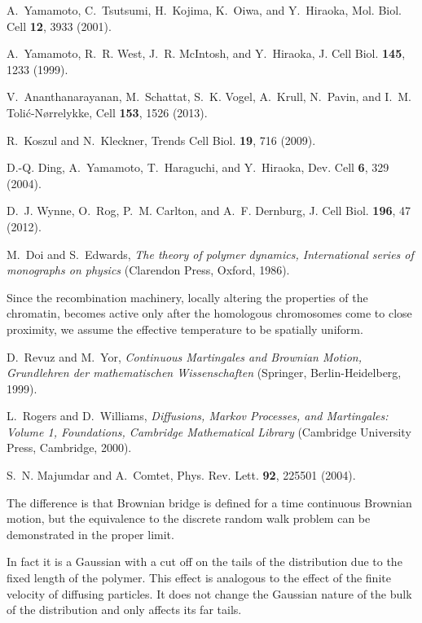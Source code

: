 \documentclass[aps,showpacs,twocolumn,floatfix,prx,superscriptaddress]{revtex4-1}
\begin{document}
\begin{thebibliography}{10}
A.~Yamamoto,
  C.~Tsutsumi,
  H.~Kojima,
  K.~Oiwa, and
  Y.~Hiraoka,
  Mol. Biol. Cell \textbf{12},
  3933 (2001).

A.~Yamamoto,
  R.~R. West,
  J.~R. McIntosh,
  and Y.~Hiraoka,
  J. Cell Biol.
  \textbf{145}, 1233 (1999).

V.~Ananthanarayanan,
  M.~Schattat,
  S.~K. Vogel,
  A.~Krull,
  N.~Pavin, and
  I.~M. Toli\'c-N\o rrelykke,
  Cell \textbf{153}, 1526
  (2013).

R.~Koszul and
  N.~Kleckner,
  Trends Cell Biol. \textbf{19},
  716 (2009).

D.-Q. Ding,
  A.~Yamamoto,
  T.~Haraguchi,
  and Y.~Hiraoka,
  Dev. Cell \textbf{6},
  329 (2004).

D.~J. Wynne,
  O.~Rog,
  P.~M. Carlton,
  and A.~F.
  Dernburg, J. Cell Biol.
  \textbf{196}, 47 (2012).

M.~Doi and
  S.~Edwards,
  \emph{The theory of polymer dynamics, International series
  of monographs on physics} (Clarendon Press, Oxford,
  1986).
  
{\color{blue} Since the recombination machinery, locally altering the properties of the chromatin, becomes active only after the homologous chromosomes come to close proximity, we assume the effective temperature to be spatially uniform.}

D.~Revuz and
  M.~Yor,
  \emph{Continuous Martingales and Brownian Motion,
  Grundlehren der mathematischen Wissenschaften} (Springer, Berlin-Heidelberg, 1999).

L.~Rogers and
  D.~Williams,
  \emph{Diffusions, Markov Processes, and Martingales: Volume
  1, Foundations, Cambridge Mathematical Library}
  (Cambridge University Press, Cambridge, 2000).

S.~N. Majumdar and
  A.~Comtet,
  Phys. Rev. Lett. \textbf{92},
  225501 (2004).
  

The difference is that Brownian bridge is defined for a time continuous Brownian motion, but the equivalence to the discrete random walk problem can be demonstrated in the proper limit.

In fact it is a Gaussian with a cut off on the tails of the distribution due to the fixed length of the polymer. This effect is analogous to the effect of the finite velocity of diffusing particles. It does not change the Gaussian nature of the bulk of the distribution and only affects its far tails.


\end{thebibliography}
\end{document}
